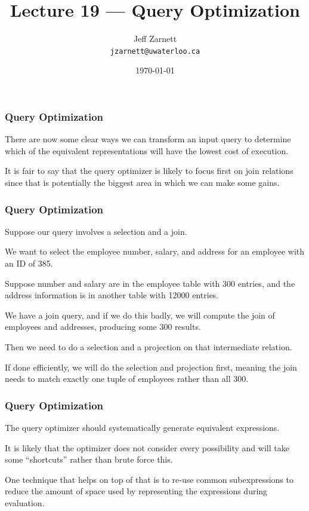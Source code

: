 

\title{Lecture 19 --- Query Optimization}

\author{Jeff Zarnett \\ \small \texttt{jzarnett@uwaterloo.ca}}
\date{\today}




\begin{frame}
  \titlepage

 \end{frame}


\begin{frame}
\frametitle{Query Optimization}

There are now some clear ways we can transform an input query to determine which of the equivalent representations will have the lowest cost of execution. 

It is fair to say that the query optimizer is likely to focus first on join relations since that is potentially the biggest area in which we can make some gains.

\end{frame}

\begin{frame}
\frametitle{Query Optimization}

Suppose our query involves a selection and a join. 

We want to select the employee number, salary, and address for an employee with an ID of 385. 

Suppose number and salary are in the employee table with 300 entries, and the address information is in another table with 12000 entries. 

We have a join query, and if we do this badly, we will compute the join of employees and addresses, producing some 300 results.

Then we need to do a selection and a projection on that intermediate relation.

If done efficiently, we will do the selection and projection first, meaning the join needs to match exactly one tuple of employees rather than all 300. 

\end{frame}

\begin{frame}
\frametitle{Query Optimization}
The query optimizer should systematically generate equivalent expressions. 

It is likely that the optimizer does not consider every possibility and will take some ``shortcuts'' rather than brute force this. 

One technique that helps on top of that is to re-use common subexpressions to reduce the amount of space used by representing the expressions during evaluation.


\end{frame}

